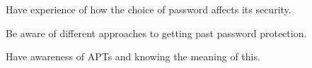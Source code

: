 \item Have experience of how the choice of password affects its security.
\item Be aware of different approaches to getting past password protection.
\item Have awareness of \acp{APT} and knowing the meaning of this.
